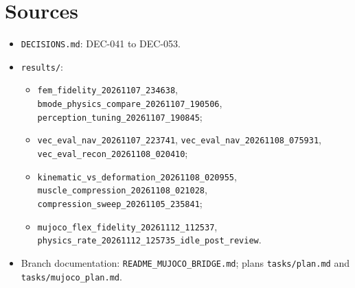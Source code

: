 \documentclass[11pt,a4paper]{article}
\newcommand{\src}[1]{\texttt{\small #1}}
\newcommand{\dec}[1]{\textsf{#1}}
\begin{document}
\section{Sources}
\small
\begin{itemize}
  \item \src{DECISIONS.md}: \dec{DEC-041} to \dec{DEC-053}.
  \item \src{results/}:
    \begin{itemize}
      \item \src{fem\_fidelity\_20261107\_234638}, \src{bmode\_physics\_compare\_20261107\_190506},
        \src{perception\_tuning\_20261107\_190845};
      \item \src{vec\_eval\_nav\_20261107\_223741}, \src{vec\_eval\_nav\_20261108\_075931},
        \src{vec\_eval\_recon\_20261108\_020410};
      \item \src{kinematic\_vs\_deformation\_20261108\_020955}, \src{muscle\_compression\_20261108\_021028},
        \src{compression\_sweep\_20261105\_235841};
      \item \src{mujoco\_flex\_fidelity\_20261112\_112537}, \src{physics\_rate\_20261112\_125735\_idle\_post\_review}.
    \end{itemize}
  \item Branch documentation: \src{README\_MUJOCO\_BRIDGE.md}; plans \src{tasks/plan.md} and \src{tasks/mujoco\_plan.md}.
\end{itemize}
\end{document}
